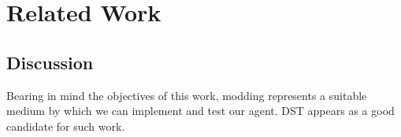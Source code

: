 \section{Related Work}






\subsection{Discussion}

Bearing in mind the objectives of this work, modding represents a suitable medium by which we can implement and test our agent.
\ac{DST} appears as a good candidate for such work.